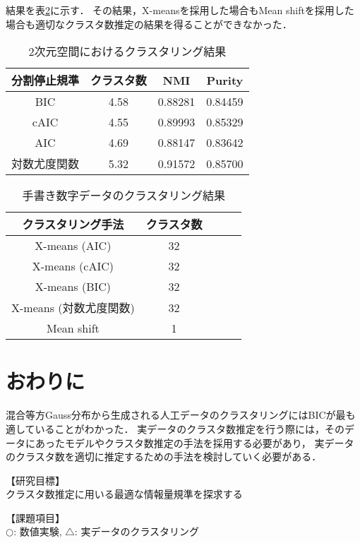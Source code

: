 \documentclass[twocolumn, 10.5pt,a4j]{ltjsarticle}
\def\tableref#1{表\ref{#1}}
\begin{document}
結果を\tableref{table:mnist}に示す．
その結果，X-meansを採用した場合もMean shiftを採用した場合も適切なクラスタ数推定の結果を得ることができなかった．

\begin{table}[htb]
  \centering
  \caption{2次元空間におけるクラスタリング結果}
  \label{table:2dim}
  \begin{tabular}{|c|c|c|c|} \hline
    分割停止規準 & クラスタ数 & NMI & Purity \\\hline
    BIC  & 4.58 & 0.88281 & 0.84459\\
    cAIC & 4.55 & 0.89993 & 0.85329\\
    AIC  & 4.69 & 0.88147 & 0.83642\\
    対数尤度関数 & 5.32 & 0.91572 & 0.85700\\\hline
  \end{tabular}
\end{table}

\begin{table}[htb]
  \centering
  \caption{手書き数字データのクラスタリング結果}
  \label{table:mnist}
  \begin{tabular}{|c|c|c|c|c|} \hline
    クラスタリング手法 & クラスタ数\\\hline
    X-means (AIC) & 32\\
    X-means (cAIC) & 32\\
    X-means (BIC) & 32\\
    X-means (対数尤度関数)& 32\\
    Mean shift & 1\\\hline
  \end{tabular}
\end{table}

\section{おわりに}
混合等方Gauss分布から生成される人工データのクラスタリングにはBICが最も適していることがわかった．
実データのクラスタ数推定を行う際には，そのデータにあったモデルやクラスタ数推定の手法を採用する必要があり，
実データのクラスタ数を適切に推定するための手法を検討していく必要がある．

\vspace{1em}
\noindent【研究目標】\\
クラスタ数推定に用いる最適な情報量規準を探求する

\vspace{1em}
\noindent【課題項目】\\
$\bigcirc$: 数値実験, $\bigtriangleup$: 実データのクラスタリング\noindent
\end{document}
